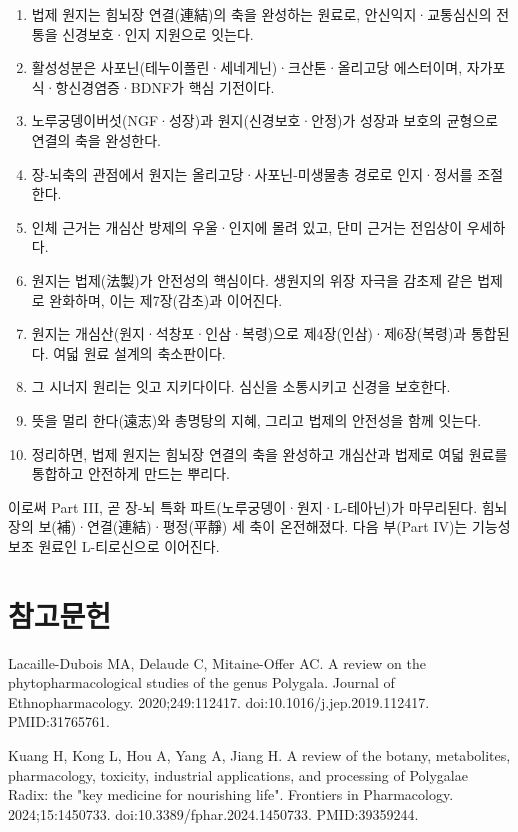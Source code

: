 \documentclass[12pt,oneside]{book}
\newcommand{\refstart}{\par\begingroup\fontsize{8.5pt}{10.2pt}\selectfont\setlength{\parskip}{1.4pt}\raggedright}
\newcommand{\reff}[2]{\par\hangindent=7mm\hangafter=1\noindent[#1]\hspace{2mm}#2\par}
\begin{document}
\begin{enumerate}[leftmargin=6mm,itemsep=1pt,topsep=2pt]
  \item 법제 원지는 힘뇌장 연결(連結)의 축을 완성하는 원료로, 안신익지·교통심신의 전통을 신경보호·인지 지원으로 잇는다.
  \item 활성성분은 사포닌(테누이폴린·세네게닌)·크산톤·올리고당 에스터이며, 자가포식·항신경염증·BDNF가 핵심 기전이다.
  \item 노루궁뎅이버섯(NGF·성장)과 원지(신경보호·안정)가 성장과 보호의 균형으로 연결의 축을 완성한다.
  \item 장-뇌축의 관점에서 원지는 올리고당·사포닌-미생물총 경로로 인지·정서를 조절한다.
  \item 인체 근거는 개심산 방제의 우울·인지에 몰려 있고, 단미 근거는 전임상이 우세하다.
  \item 원지는 법제(法製)가 안전성의 핵심이다. 생원지의 위장 자극을 감초제 같은 법제로 완화하며, 이는 제7장(감초)과 이어진다.
  \item 원지는 개심산(원지·석창포·인삼·복령)으로 제4장(인삼)·제6장(복령)과 통합된다. 여덟 원료 설계의 축소판이다.
  \item 그 시너지 원리는 잇고 지키다이다. 심신을 소통시키고 신경을 보호한다.
  \item 뜻을 멀리 한다(遠志)와 총명탕의 지혜, 그리고 법제의 안전성을 함께 잇는다.
  \item 정리하면, 법제 원지는 힘뇌장 연결의 축을 완성하고 개심산과 법제로 여덟 원료를 통합하고 안전하게 만드는 뿌리다.
\end{enumerate}

이로써 Part III, 곧 장-뇌 특화 파트(노루궁뎅이·원지·L-테아닌)가 마무리된다. 힘뇌장의 보(補)·연결(連結)·평정(平靜) 세 축이 온전해졌다. 다음 부(Part IV)는 기능성 보조 원료인 L-티로신으로 이어진다.

\section*{참고문헌}

\refstart

\reff{1}{Lacaille-Dubois MA, Delaude C, Mitaine-Offer AC. A review on the phytopharmacological studies of the genus Polygala. Journal of Ethnopharmacology. 2020;249:112417. doi:10.1016/j.jep.2019.112417. PMID:31765761.}

\reff{2}{Kuang H, Kong L, Hou A, Yang A, Jiang H. A review of the botany, metabolites, pharmacology, toxicity, industrial applications, and processing of Polygalae Radix: the "key medicine for nourishing life". Frontiers in Pharmacology. 2024;15:1450733. doi:10.3389/fphar.2024.1450733. PMID:39359244.}
\end{document}
